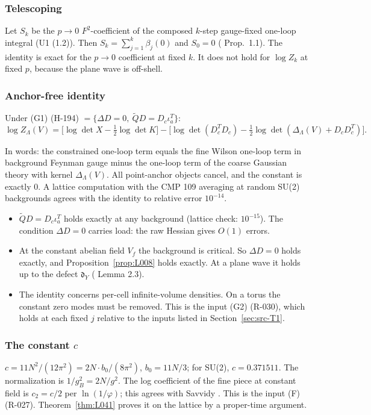 \subsubsection{Telescoping}\label{sec:telescope}

Let $S_k$ be the $p\to 0$ $F^2$-coefficient of the composed $k$-step gauge-fixed one-loop integral (U1 (1.2)). Then $S_k=\sum_{j=1}^{k}\beta_j(0)$ and $S_0=0$ ( Prop.\ 1.1). The identity is exact for the $p\to0$ coefficient at fixed $k$. It does not hold for $\log Z_k$ at fixed $p$, because the plane wave is off-shell.

\subsubsection{Anchor-free identity}\label{sec:prop21}

\begin{proposition}\label{prop:L008}
Under (G1) (H-194) $=\{\Delta D=0,\ \tilde QD=D_c\iota_a^T\}$:
\[
\log Z_\Lambda(V)=\bigl[\log\det X-\tfrac12\log\det K\bigr]-\bigl[\log\det(D_c^TD_c)-\tfrac12\log\det(\Delta_\Lambda(V)+D_cD_c^T)\bigr].
\]
\end{proposition}
In words: the constrained one-loop term equals the fine Wilson one-loop term in background Feynman gauge minus the one-loop term of the coarse Gaussian theory with kernel $\Delta_\Lambda(V)$. All point-anchor objects cancel, and the constant is exactly 0. A lattice computation with the CMP 109 averaging at random SU(2) backgrounds agrees with the identity to relative error $10^{-14}$.
\begin{itemize}
\item $\tilde QD=D_c\iota_a^T$ holds exactly at any background (lattice check: $10^{-15}$). The condition $\Delta D=0$ carries load: the raw Hessian gives $O(1)$ errors.
\item At the constant abelian field $V_f$ the background is critical. So $\Delta D=0$ holds exactly, and Proposition~\ref{prop:L008} holds exactly. At a plane wave it holds up to the defect $\mathfrak d_Y$ ( Lemma 2.3).
\item The identity concerns per-cell infinite-volume densities. On a torus the constant zero modes must be removed. This is the input (G2) (R-030), which holds at each fixed $j$ relative to the inputs listed in Section~\ref{sec:src-T1}.
\end{itemize}

\subsubsection{The constant $c$}\label{sec:const}
$c=11N^2/(12\pi^2)=2N\cdot b_0/(8\pi^2)$, $b_0=11N/3$; for SU(2), $c=0.371511$. The normalization is $1/g_B^2=2N/g^2$. The log coefficient of the fine piece at constant field is $c_2=c/2$ per $\ln(1/\varphi)$; this agrees with Savvidy \cite[eq.~(1.4)]{Savvidy2019}. This is the input (F) (R-027). Theorem~\ref{thm:L041} proves it on the lattice by a proper-time argument.

